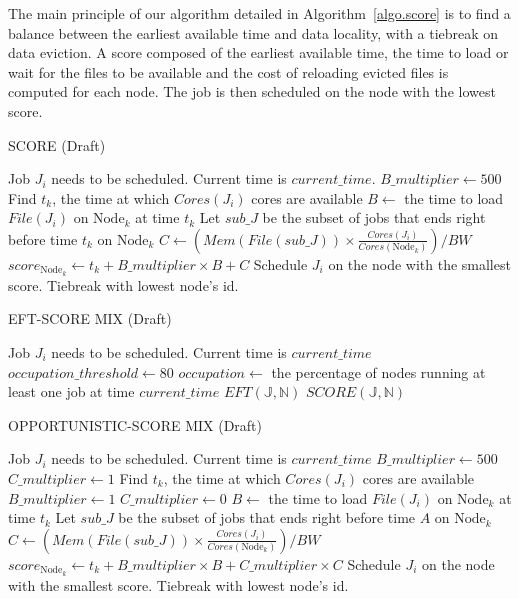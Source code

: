 \documentclass[conference,10pt]{IEEEtran}
\newcommand{\Node}[1]{\ensuremath{\mathrm{Node}_{#1}}\xspace}
\newcommand{\file}{\ensuremath{\mathit{File}}\xspace}
\newcommand{\memory}{\ensuremath{\mathit{Mem}}\xspace}
\newcommand{\bandwidth}{\mathit{BW}\xspace}
\newcommand{\core}{\mathit{Cores}\xspace}
\newcommand{\jobset}{\ensuremath{\mathbb{J}}\xspace}
\newcommand{\nodeset}{\ensuremath{\mathbb{N}}\xspace}
\begin{document}
The main principle of our algorithm detailed in Algorithm~\ref{algo.score} 
is to find a balance between the earliest available time and data locality,
with a tiebreak on data eviction. A score composed of the earliest available 
time, the time to load or wait for the files to be available and the cost of 
reloading evicted files is computed for each node. The job is then scheduled
on the node with the lowest score.

\begin{algorithm}[htbp]\caption{SCORE (Draft)}\label{algo.score}\begin{algorithmic}[1]
	\State Job $J_i$ needs to be scheduled. Current time is $current\_time$.
	\State $B\_multiplier \gets 500$
	\ForEach {$\Node{k} \in \nodeset$}
		\State Find $t_k$, the time at which $\core(J_i)$ cores are available
		\State $B \gets$ the time to load $\file(J_i)$ on $\Node{k}$ at time $t_k$ 
		\State Let $\mathit{sub\_J}$ be the subset of jobs that ends right before time $t_k$ on $\Node{k}$
		\State $C \gets (\memory(\file(\mathit{sub\_J})) \times \frac{\core(J_i)}{\core(\Node{k})})/\bandwidth$
		\State $score_{\Node{k}} \gets t_k + B\_multiplier \times B + C$
	\EndFor
	\State Schedule $J_i$ on the node with the smallest score. Tiebreak with lowest node's id.
\end{algorithmic}\end{algorithm}

\begin{algorithm}[htbp]
\caption{EFT-SCORE MIX (Draft)}
\begin{algorithmic}[1]
	\State Job $J_i$ needs to be scheduled. Current time is $current\_time$
	\State $occupation\_threshold \gets 80$ 
	\State $occupation \gets$ the percentage of nodes running at least one job at time $current\_time$
		\State $EFT(\jobset,\nodeset)$
	\Else
		\State $SCORE(\jobset,\nodeset)$
	\EndIf
\end{algorithmic}
\end{algorithm}

\begin{algorithm}[htbp]
\caption{OPPORTUNISTIC-SCORE MIX (Draft)}
\begin{algorithmic}[1]
	\State Job $J_i$ needs to be scheduled. Current time is $current\_time$
	\State $B\_multiplier \gets 500$
	\State $C\_multiplier \gets 1$
	\ForEach {$\Node{k} \in \nodeset$}
		\State Find $t_k$, the time at which $\core(J_i)$ cores are available
			\State $B\_multiplier \gets 1$
			\State $C\_multiplier \gets 0$
		\EndIf
		\State $B \gets$ the time to load $\file(J_i)$ on $\Node{k}$ at time $t_k$
		\State Let $\mathit{sub\_J}$ be the subset of jobs that ends right before time $A$ on $\Node{k}$
		\State $C \gets (\memory(\file(\mathit{sub\_J})) \times \frac{\core(J_i)}{\core(\Node{k})})/\bandwidth$
		\State $score_{\Node{k}} \gets t_k + B\_multiplier \times B + C\_multiplier \times C$
	\EndFor
	\State Schedule $J_i$ on the node with the smallest score. Tiebreak with lowest node's id.
\end{algorithmic}
\end{algorithm}
\end{document}
